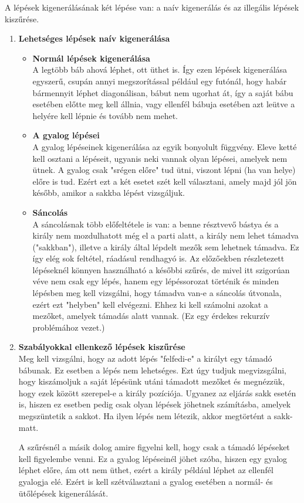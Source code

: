 \documentclass[twoside, a4paper, 12pt]{book}
\begin{document}
A lépések kigenerálásának két lépése van: a naív kigenerálás és az illegális lépések kiszűrése.
\begin{enumerate}
	\item \textbf{Lehetséges lépések naív kigenerálása}
	\begin{itemize}
		\item \textbf{Normál lépések kigenerálása} \\
		A legtöbb báb ahová léphet, ott üthet is. Így ezen lépések kigenerálása egyszerű, csupán annyi megszorítással például egy futónál, hogy habár bármennyit léphet diagonálisan, bábut nem ugorhat át, így a saját bábu esetében előtte meg kell állnia, vagy ellenfél bábuja esetében azt leütve a helyére kell lépnie és tovább nem mehet.
		
		\item \textbf{A gyalog lépései} \\
		A gyalog lépéseinek kigenerálása az egyik bonyolult függvény. Eleve ketté kell osztani a lépéseit, ugyanis neki vannak olyan lépései, amelyek nem ütnek. A gyalog csak "srégen előre" tud ütni, viszont lépni (ha van helye) előre is tud. Ezért ezt a két esetet szét kell választani, amely majd jól jön később, amikor a sakkba lépést vizsgáljuk. 
		
		\item \textbf{Sáncolás} \\
		A sáncolásnak több előfeltétele is van: a benne résztvevő bástya és a király nem mozdulhatott még el a parti alatt, a király nem lehet támadva ("sakkban"), illetve a király által lépdelt mezők sem lehetnek támadva. Ez így elég sok feltétel, ráadásul rendhagyó is. Az előzőekben részletezett lépéseknél könnyen használható a későbbi szűrés, de mivel itt szigorúan véve nem csak egy lépés, hanem egy lépéssorozat történik és minden lépésben meg kell vizsgálni, hogy támadva van-e a sáncolás útvonala, ezért ezt "helyben" kell elvégezni. Ehhez ki kell számolni azokat a mezőket, amelyek támadás alatt vannak. (Ez egy érdekes rekurzív problémához vezet.)
	\end{itemize}
	
	\item \textbf{Szabályokkal ellenkező lépések kiszűrése} \\
	Meg kell vizsgálni, hogy az adott lépés "felfedi-e" a királyt egy támadó bábunak. Ez esetben a lépés nem lehetséges. Ezt úgy tudjuk megvizsgálni, hogy kiszámoljuk a saját lépésünk utáni támadott mezőket és megnézzük, hogy ezek között szerepel-e a király pozíciója. Ugyanez az eljárás sakk esetén is, hiszen ez esetben pedig csak olyan lépések jöhetnek számításba, amelyek megszüntetik a sakkot. Ha ilyen lépés nem létezik, akkor megtörtént a sakk-matt.
	
	A szűrésnél a másik dolog amire figyelni kell, hogy csak a támadó lépéseket kell figyelembe venni. Ez a gyalog lépéseinél jöhet szóba, hiszen egy gyalog léphet előre, ám ott nem üthet, ezért a király például léphet az ellenfél gyalogja elé. Ezért is kell szétválasztani a gyalog esetében a normál- és ütőlépések kigenerálását.
\end{enumerate}
\end{document}
